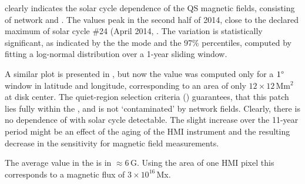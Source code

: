 \documentclass{aa}
\begin{document}
 clearly indicates the solar cycle dependence of the 
QS
magnetic fields, consisting of network and \IN{}. The \brms{} values peak in the second half of 2014, close to the declared maximum of 
solar cycle \#24 (April 2014, . The variation is statistically significant, as indicated by the the mode and the 97\% percentiles, computed by fitting a log-normal distribution over a 1-year sliding window.

A similar plot is presented in , but now the \brms{} value was computed only for a $1\degree$ window in latitude and longitude, corresponding to an area of only $12\times 12$\,Mm$^2$ at disk center. The quiet-region selection criteria () guarantees, that this patch lies fully within the \IN{}, and is not `contaminated' by network fields. Clearly, there is no dependence of \brms{} with solar cycle detectable. The 
slight increase over the 11-year period might be an effect of the aging of the HMI instrument and the resulting decrease in the sensitivity for magnetic field measurements.

The average \brms{} value in the \IN{} is in $\approx6$\,G. Using the area of one HMI pixel this corresponds to a magnetic flux of $3\times 10^{16}$\,Mx. 





\end{document}
